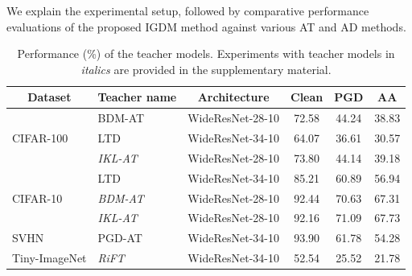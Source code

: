 \documentclass{article} %
\begin{document}
We explain the experimental setup, followed by comparative performance evaluations of the proposed IGDM method against various AT and AD methods.


\begin{table}[b]
 \centering
\caption{Performance (\%) of the teacher models. Experiments with teacher models in \textit{italics} are provided in the supplementary material.}
 \begin{tabular}{lllccc}
 \toprule
     \multicolumn{1}{c}{Dataset} & \multicolumn{1}{c}{Teacher name} & \multicolumn{1}{c}{Architecture}  & Clean & PGD & AA\\
\midrule


\multicolumn{1}{l}{\multirow{3}{*}{CIFAR-100}} & BDM-AT \citep{wang2023better} & WideResNet-28-10 & 72.58 & 44.24 & 38.83 \\
&  LTD \citep{LTD} & WideResNet-34-10 & 64.07 & 36.61 & 30.57 \\

& \textit{IKL-AT \citep{cui2023decoupled}} & WideResNet-28-10 & 73.80 & 44.14 & 39.18 \\
\midrule

\multicolumn{1}{l}{\multirow{3}{*}{CIFAR-10}} & LTD \citep{LTD} & WideResNet-34-10 & 85.21 & 60.89 & 56.94 \\
 & \textit{BDM-AT \citep{wang2023better}} & WideResNet-28-10  & 92.44 & 70.63 & 67.31 \\
 & \textit{IKL-AT \citep{cui2023decoupled}} & WideResNet-28-10  & 92.16 & 71.09 & 67.73 \\
\midrule
 SVHN & PGD-AT \citep{PGD}& WideResNet-34-10 & 93.90 & 61.78 & 54.28  \\
\midrule
 Tiny-ImageNet & \textit{RiFT \citep{zhu2023improving}} & WideResNet-34-10 & 52.54 & 25.52 & 21.78  \\
 \bottomrule
 \end{tabular}

 \label{tab:main_teacher}

\end{table}
\end{document}
